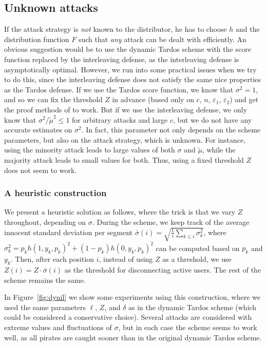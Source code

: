 \documentclass[10pt,a4paper,twocolumn]{article}
\newcommand{\eps}{\varepsilon}
\begin{document}
\subsection{Unknown attacks}

If the attack strategy is \textit{not} known to the distributor, he has to choose $h$ and the distribution function $F$ such that \textit{any} attack can be dealt with efficiently. An obvious suggestion would be to use the dynamic Tardos scheme with the score function replaced by the interleaving defense, as the interleaving defense is asymptotically optimal. However, we run into some practical issues when we try to do this, since the interleaving defense does not satisfy the same nice properties as the Tardos defense. If we use the Tardos score function, we know that $\sigma^2 = 1$, and so we can fix the threshold $Z$ in advance (based only on $c$, $n$, $\eps_1$, $\eps_2$) and get the proof methods of \cite{laarhoven13tit} to work. But if we use the interleaving defense, we only know that $\sigma^2/\tilde{\mu}^2 \leq 1$ for arbitrary attacks and large $c$, but we do not have any accurate estimates on $\sigma^2$. In fact, this parameter not only depends on the scheme parameters, but also on the attack strategy, which is unknown. For instance, using the minority attack leads to large values of both $\sigma$ and $\tilde{\mu}$, while the majority attack leads to small values for both. Thus, using a fixed threshold $Z$ does not seem to work.

\subsubsection{A heuristic construction}
We present a heuristic solution as follows, where the trick is that we vary $Z$ throughout, depending on $\sigma$. During the scheme, we keep track of the average innocent standard deviation per segment $\bar{\sigma}(i) = \sqrt{\frac{1}{i} \sum_{k \leq i} \sigma_k^2}$, where $\sigma_k^2 = p_k h(1,y_k,p_k)^2 + (1 - p_k) h(0,y_k,p_k)^2$ can be computed based on $p_k$ and $y_k$. Then, after each position $i$, instead of using $Z$ as a threshold, we use $Z(i) = Z \cdot \bar{\sigma}(i)$ as the threshold for disconnecting active users. The rest of the scheme remains the same.

In Figure~\ref{fig:dynil} we show some experiments using this construction, where we used the same parameters $\ell$, $Z$, and $\delta$ as in the dynamic Tardos scheme (which could be considered a conservative choice). Several attacks are considered with extreme values and fluctuations of $\sigma$, but in each case the scheme seems to work well, as all pirates are caught sooner than in the original dynamic Tardos scheme.  
\end{document}
